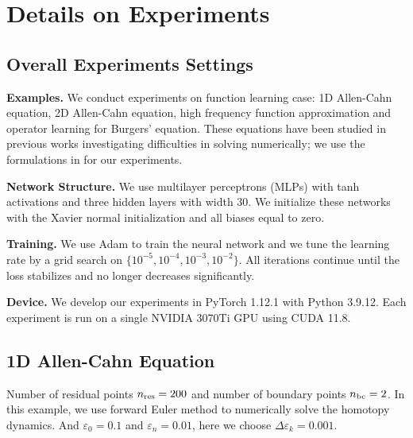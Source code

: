 \section{Details on Experiments}
\label{sec:apendix_experiments}
\subsection{Overall Experiments Settings}
\textbf{Examples.} We conduct experiments on function learning case: 1D Allen-Cahn equation, 2D Allen-Cahn equation, high frequency function approximation and operator learning for Burgers' equation. These equations have been studied in previous works investigating difficulties in solving numerically; we use the formulations in \citet{xu2020variational, ZHANG2024112638,hao2019convergence} for our experiments. 

\textbf{Network Structure.} We use multilayer perceptrons (MLPs) with tanh activations and three hidden layers with width 30.
We initialize these networks with the Xavier normal initialization \cite{glorot2010understanding} and all biases equal to zero.


\textbf{Training.} We use Adam to train the neural network and we tune the learning rate by a grid search on $\{10^{-5}, 10^{-4}, 10^{-3}, 10^{-2}\}$. All iterations continue until the loss stabilizes and no longer decreases significantly. %


\textbf{Device.} We develop our experiments in PyTorch 1.12.1 \cite{paszke2019pytorch} with Python 3.9.12.
Each experiment is run on a single NVIDIA 3070Ti GPU using CUDA 11.8.

\subsection{1D Allen-Cahn Equation}

Number of residual points $n_\textup{res} = 200$ and number of boundary points $n_{\textup{bc}}=2$. In this example, we use forward Euler method to numerically solve the homotopy dynamics. And $\varepsilon_{0} = 0.1$ and $\varepsilon_n = 0.01$, here we choose $\Delta \varepsilon_k = 0.001$.

